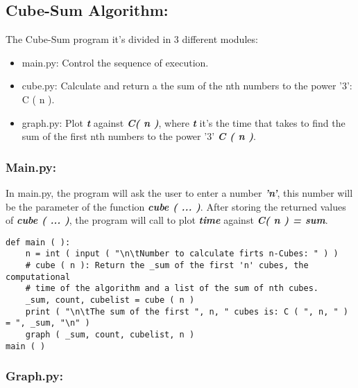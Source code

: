\documentclass[10pt,a4paper]{article}
\begin{document}
\pagebreak

\subsection{Cube-Sum Algorithm:}

The Cube-Sum program it's divided in 3 different modules:

\begin{itemize}
\item main.py: Control the sequence of execution.
\item cube.py: Calculate and return a the sum of the nth numbers to the power '3': C ( n ). 
\item graph.py: Plot {\bfseries\itshape t} against {\bfseries\itshape C( n )}, where {\bfseries\itshape t} it's the time that takes to find the sum of the first nth numbers to the power '3' {\bfseries\itshape C ( n )}.
\end{itemize}

{\bfseries\itshape\color{OliveGreen}{Observation:}} {\itshape{}}

\subsubsection{Main.py:}

In main.py, the program will ask the user to enter a number {\bfseries\itshape 'n'}, this number will be the parameter of the function {\bfseries\itshape cube ( ... )}. After storing the returned values of {\bfseries\itshape cube ( ... )}, the program will call  to plot {\bfseries\itshape time} against {\bfseries\itshape C( n ) = sum}. \hfill \break

\begin{lstlisting}
def main ( ):
    n = int ( input ( "\n\tNumber to calculate firts n-Cubes: " ) )
    # cube ( n ): Return the _sum of the first 'n' cubes, the computational
    # time of the algorithm and a list of the sum of nth cubes.
    _sum, count, cubelist = cube ( n )
    print ( "\n\tThe sum of the first ", n, " cubes is: C ( ", n, " ) = ", _sum, "\n" )
    graph ( _sum, count, cubelist, n )
main ( )
\end{lstlisting}

\subsubsection{Graph.py:}
\end{document}
